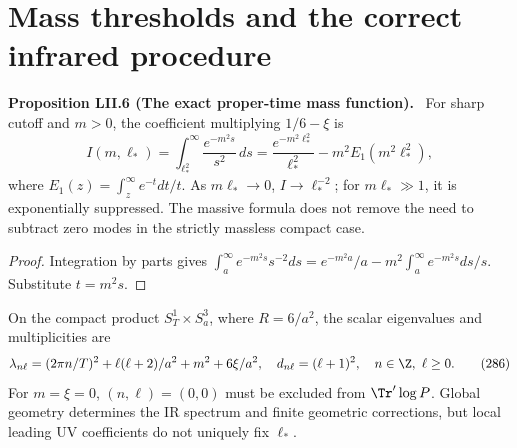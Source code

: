 \documentclass[11pt,a4paper,oneside]{book}
\newcommand{\statement}[3]{\par\medskip\noindent\textbf{#1 #2 (#3).}\ }
\begin{document}
\section{Mass thresholds and the correct infrared procedure}
\statement{Proposition}{LII.6}{The exact proper-time mass function}
For sharp cutoff and $m>0$, the coefficient multiplying $1/6-\xi$ is
\begin{equation}I(m,\ell_*)=\int_{\ell_*^2}^\infty\frac{e^{-m^2s}}{s^2}\,ds=\frac{e^{-m^2\ell_*^2}}{\ell_*^2}-m^2E_1(m^2\ell_*^2),\tag{285}\end{equation}
where $E_1(z)=\int_z^\infty e^{-t}dt/t$. As $m\ell_*\to0$, $I\to\ell_*^{-2}$; for $m\ell_*\gg1$, it is exponentially suppressed. The massive formula does not remove the need to subtract zero modes in the strictly massless compact case.
\begin{proof}
Integration by parts gives $\int_a^\infty e^{-m^2s}s^{-2}ds=e^{-m^2a}/a-m^2\int_a^\infty e^{-m^2s}ds/s$. Substitute $t=m^2s$.
\end{proof}
On the compact product $S_T^1\times S_a^3$, where $R=6/a^2$, the scalar eigenvalues and multiplicities are
\begin{equation}\lambda_{n\ell}=(2\pi n/T)^2+\ell(\ell+2)/a^2+m^2+6\xi/a^2,\quad d_{n\ell}=(\ell+1)^2,\quad n\in\Z,\ \ell\ge0.\tag{286}\end{equation}
For $m=\xi=0$, $(n,\ell)=(0,0)$ must be excluded from $\Tr'\log P$. Global geometry determines the IR spectrum and finite geometric corrections, but local leading UV coefficients do not uniquely fix $\ell_*$.
\end{document}
